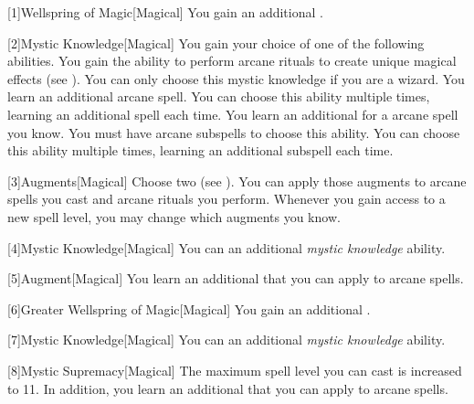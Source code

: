         [1]{Wellspring of Magic}[Magical]
        You gain an additional .

        [2]{Mystic Knowledge}[Magical]
        You gain your choice of one of the following abilities.
        {
             You gain the ability to perform arcane rituals to create unique magical effects (see ).
                You can only choose this mystic knowledge if you are a wizard.
             You learn an additional arcane spell.
                You can choose this ability multiple times, learning an additional spell each time.
             You learn an additional  for a arcane spell you know.
                You must have arcane subspells to choose this ability.
                You can choose this ability multiple times, learning an additional subspell each time.
        }

        [3]{Augments}[Magical]
        Choose two  (see ).
        You can apply those augments to arcane spells you cast and arcane rituals you perform.
        Whenever you gain access to a new spell level, you may change which augments you know.

        [4]{Mystic Knowledge}[Magical]
        You can an additional \textit{mystic knowledge} ability.

        [5]{Augment}[Magical]
        You learn an additional  that you can apply to arcane spells.

        [6]{Greater Wellspring of Magic}[Magical]
        You gain an additional .

        [7]{Mystic Knowledge}[Magical]
        You can an additional \textit{mystic knowledge} ability.

        [8]{Mystic Supremacy}[Magical]
        The maximum spell level you can cast is increased to 11.
        In addition, you learn an additional  that you can apply to arcane spells.

\newpage

